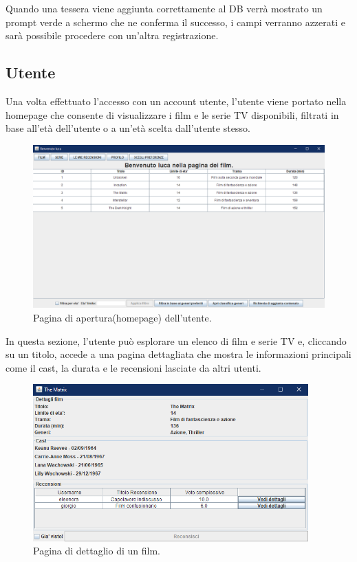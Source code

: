 \documentclass[a4paper,12pt]{report}
\begin{document}
Quando una tessera viene aggiunta correttamente al DB verrà mostrato un prompt verde a schermo che ne conferma il successo, i campi verranno azzerati e sarà possibile procedere con un'altra registrazione.
\subsection{Utente}
Una volta effettuato l'accesso con un account utente, l'utente viene portato nella homepage che consente di visualizzare i film e le serie TV disponibili, filtrati in base all'età dell'utente o a un'età scelta dall'utente stesso. 
\begin{figure}[H]
	\centering
	\includegraphics[width=375pt]{appimg/userhomepage.png}
	\caption{Pagina di apertura(homepage) dell'utente.}
\end{figure}

In questa sezione, l'utente può esplorare un elenco di film e serie TV e, cliccando su un titolo, accede a una pagina dettagliata che mostra le informazioni principali come il cast, la durata e le recensioni lasciate da altri utenti.
\begin{figure}[H]
	\centering
	\includegraphics[width=300pt]{appimg/userfilmdetails.png}
	\caption{Pagina di dettaglio di un film.}
\end{figure}
\end{document}
